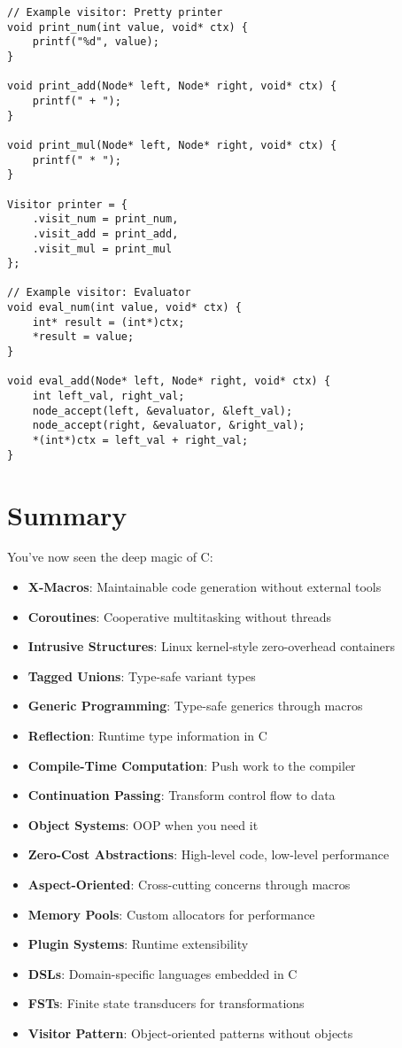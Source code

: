 \begin{description}[style=nextline,leftmargin=0pt]
\begin{lstlisting}
// Example visitor: Pretty printer
void print_num(int value, void* ctx) {
    printf("%d", value);
}

void print_add(Node* left, Node* right, void* ctx) {
    printf(" + ");
}

void print_mul(Node* left, Node* right, void* ctx) {
    printf(" * ");
}

Visitor printer = {
    .visit_num = print_num,
    .visit_add = print_add,
    .visit_mul = print_mul
};

// Example visitor: Evaluator
void eval_num(int value, void* ctx) {
    int* result = (int*)ctx;
    *result = value;
}

void eval_add(Node* left, Node* right, void* ctx) {
    int left_val, right_val;
    node_accept(left, &evaluator, &left_val);
    node_accept(right, &evaluator, &right_val);
    *(int*)ctx = left_val + right_val;
}
\end{lstlisting}

\section{Summary}

You've now seen the deep magic of C:

\begin{itemize}
    \item \textbf{X-Macros}: Maintainable code generation without external tools
    \item \textbf{Coroutines}: Cooperative multitasking without threads
    \item \textbf{Intrusive Structures}: Linux kernel-style zero-overhead containers
    \item \textbf{Tagged Unions}: Type-safe variant types
    \item \textbf{Generic Programming}: Type-safe generics through macros
    \item \textbf{Reflection}: Runtime type information in C
    \item \textbf{Compile-Time Computation}: Push work to the compiler
    \item \textbf{Continuation Passing}: Transform control flow to data
    \item \textbf{Object Systems}: OOP when you need it
    \item \textbf{Zero-Cost Abstractions}: High-level code, low-level performance
    \item \textbf{Aspect-Oriented}: Cross-cutting concerns through macros
    \item \textbf{Memory Pools}: Custom allocators for performance
    \item \textbf{Plugin Systems}: Runtime extensibility
    \item \textbf{DSLs}: Domain-specific languages embedded in C
    \item \textbf{FSTs}: Finite state transducers for transformations
    \item \textbf{Visitor Pattern}: Object-oriented patterns without objects
\end{itemize}


\end{description}
